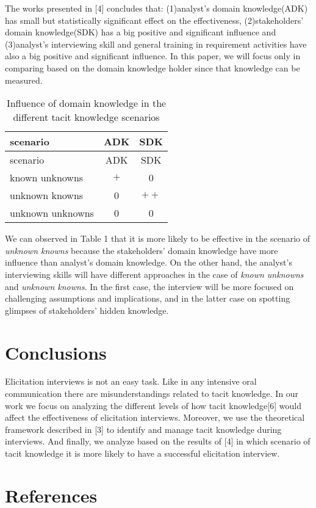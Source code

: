 \documentclass[]{llncs}
\begin{document}
The works presented in {[}4{]} concludes that: (1)analyst's domain
knowledge(ADK) has small but statistically significant effect on the
effectiveness, (2)stakeholders' domain knowledge(SDK) has a big positive
and significant influence and (3)analyst's interviewing skill and
general training in requirement activities have also a big positive and
significant influence. In this paper, we will focus only in comparing
based on the domain knowledge holder since that knowledge can be
measured.

\begin{longtable}[]{@{}lcc@{}}
\caption{Influence of domain knowledge in the different tacit knowledge
scenarios}\tabularnewline
\toprule
scenario & ADK & SDK\tabularnewline
\midrule
\endfirsthead
\toprule
scenario & ADK & SDK\tabularnewline
\midrule
\endhead
known unknowns & \(+\) & 0\tabularnewline
unknown knowns & 0 & \(++\)\tabularnewline
unknown unknowns & 0 & 0\tabularnewline
\bottomrule
\end{longtable}

We can observed in Table 1 that it is more likely to be effective in the
scenario of \emph{unknown knowns} because the stakeholders' domain
knowledge have more influence than analyst's domain knowledge. On the
other hand, the analyst's interviewing skills will have different
approaches in the case of \emph{known unknowns} and \emph{unknown
knowns}. In the first case, the interview will be more focused on
challenging assumptions and implications, and in the latter case on
spotting glimpses of stakeholders' hidden knowledge.

\hypertarget{conclusions}{%
\section{Conclusions}\label{conclusions}}

Elicitation interviews is not an easy task. Like in any intensive oral
communication there are misunderstandings related to tacit knowledge. In
our work we focus on analyzing the different levels of how tacit
knowledge{[}6{]} would affect the effectiveness of elicitation
interviews. Moreover, we use the theoretical framework described in
{[}3{]} to identify and manage tacit knowledge during interviews. And
finally, we analyze based on the results of {[}4{]} in which scenario of
tacit knowledge it is more likely to have a successful elicitation
interview.

\hypertarget{references}{%
\section*{References}\label{references}}
\end{document}
